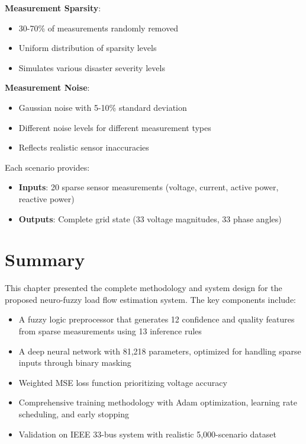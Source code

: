 \documentclass[12pt,a4paper]{report}
\begin{document}
\textbf{Measurement Sparsity}:
\begin{itemize}
    \item 30-70\% of measurements randomly removed
    \item Uniform distribution of sparsity levels
    \item Simulates various disaster severity levels
\end{itemize}

\textbf{Measurement Noise}:
\begin{itemize}
    \item Gaussian noise with 5-10\% standard deviation
    \item Different noise levels for different measurement types
    \item Reflects realistic sensor inaccuracies
\end{itemize}

Each scenario provides:
\begin{itemize}
    \item \textbf{Inputs}: 20 sparse sensor measurements (voltage, current, active power, reactive power)
    \item \textbf{Outputs}: Complete grid state (33 voltage magnitudes, 33 phase angles)
\end{itemize}

\section{Summary}

This chapter presented the complete methodology and system design for the proposed neuro-fuzzy load flow estimation system. The key components include:

\begin{itemize}
    \item A fuzzy logic preprocessor that generates 12 confidence and quality features from sparse measurements using 13 inference rules
    \item A deep neural network with 81,218 parameters, optimized for handling sparse inputs through binary masking
    \item Weighted MSE loss function prioritizing voltage accuracy
    \item Comprehensive training methodology with Adam optimization, learning rate scheduling, and early stopping
    \item Validation on IEEE 33-bus system with realistic 5,000-scenario dataset
\end{itemize}
\end{document}
